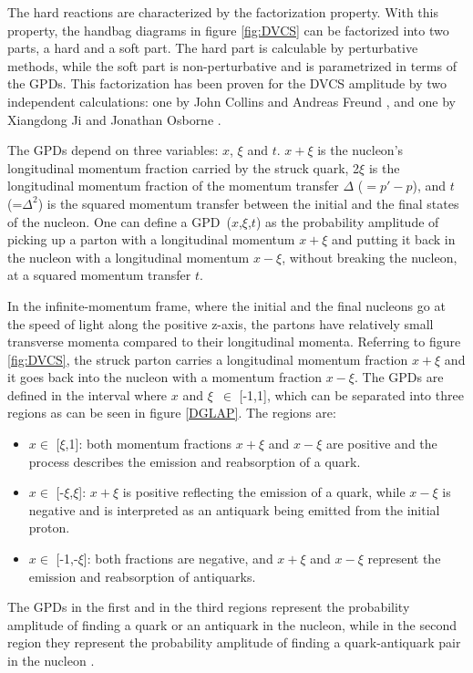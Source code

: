   The hard reactions are characterized by the factorization property. With this 
property, the handbag diagrams in figure \ref{fig:DVCS} can be factorized into 
two parts, a hard and a soft part. The hard part is calculable by perturbative 
methods, while the soft part is non-perturbative and is parametrized in terms 
of the GPDs. This factorization has been proven for the DVCS amplitude by two 
independent calculations: one by John Collins and Andreas Freund 
\cite{Freund_Collins}, and one by Xiangdong Ji and Jonathan Osborne 
\cite{Ji_Osborne}.

The GPDs depend on three variables: $x$, $\xi$ and $t$.  $x+\xi$ is the 
nucleon's longitudinal momentum fraction carried by the struck quark, 2$\xi$ is 
the longitudinal momentum fraction of the momentum transfer $\Delta$ ($= p' - 
p$), and $t$ (=$\Delta^{2}$) is the squared momentum transfer between the 
initial and the final states of the nucleon. One can define a 
GPD~($x$,$\xi$,$t$) as the probability amplitude of picking up a parton with a 
longitudinal momentum $x+\xi$ and putting it back in the nucleon with a 
longitudinal momentum $x-\xi$, without breaking the nucleon, at a squared 
momentum transfer $t$. 

In the infinite-momentum frame, where the initial and the final nucleons go at 
the speed of light along the positive z-axis, the partons have relatively small 
transverse momenta compared to their longitudinal momenta. Referring to figure 
\ref{fig:DVCS}, the struck parton carries a longitudinal momentum fraction 
$x+\xi$ and it goes back into the nucleon with a momentum fraction $x-\xi$. The 
GPDs are defined in the interval where $x$ and $\xi$~$\in$ [-1,1], which can be 
separated into three regions as can be seen in figure \ref{DGLAP}.  The regions 
are:
\begin{itemize}
\item $x\in$ [$\xi$,1]: both momentum fractions $x+\xi$ and $x-\xi$ are 
   positive and the process describes the emission and reabsorption of a quark.
\item $x\in $ [-$\xi$,$\xi$]: $x+\xi$ is positive reflecting the emission of a 
   quark, while $x-\xi$ is negative and is interpreted as an antiquark being 
   emitted from the initial proton.
\item $x\in$ [-1,-$\xi$]: both fractions are negative, and $x+\xi$ and $x-\xi$ 
   represent the emission and reabsorption of antiquarks.
   \end{itemize}

The GPDs in the first and in the third regions represent the probability 
amplitude of finding a quark or an antiquark in the nucleon, while in the 
second region they represent the probability amplitude of finding a 
quark-antiquark pair in the nucleon \cite{Diehl:2001pm}.\\
  
